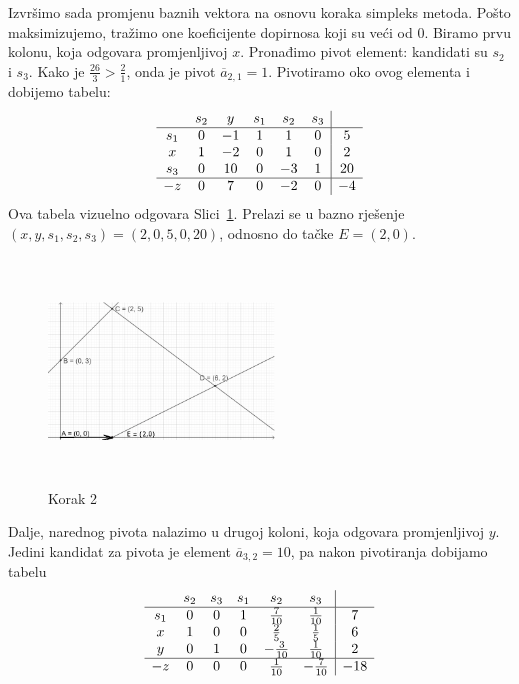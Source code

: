 \documentclass[a4paper, utf8, 11pt, colorlinks]{book}
\theoremstyle{definition}
\begin{document}
Izvršimo sada promjenu baznih vektora na osnovu  koraka simpleks metoda. Pošto maksimizujemo, 
tražimo one koeficijente dopirnosa koji su veći od 0. Biramo prvu kolonu, koja odgovara promjenljivoj $x$. Pronađimo 
pivot element: kandidati su $s_2$ i $s_3$.
Kako je $\frac{26}{3} > \frac{2}{1}$, onda je  pivot $\overline{a}_{2, 1} = 1$. Pivotiramo oko ovog elementa i dobijemo tabelu:
$$\begin{array}{cccccc| c}
       & s_2  & y  & s_1  & s_2 & s_3 &    \\ \hline
   s_1 & 0    & -1  & 1  & 1 & 0  &  5     \\
   x   & 1    & -2  & 0  & 1 & 0  &  2     \\
   s_3 & 0    & 10   &  0  & -3 & 1 & 20   \\ \hline
   -z  & 0    &  7   & 0   & -2 & 0 & -4   \\ 
\end{array}
$$ 
Ova tabela vizuelno odgovara Slici~\ref{fig:step-2}. Prelazi se u bazno rješenje $(x,y, s_1, s_2, s_3)=(2, 0, 5, 0 ,20)$, odnosno do tačke $E=(2, 0)$. 

\begin{figure}[!ht]
	\centering
	\includegraphics[width=170pt, height=170pt]{simpleks-primjer-2-sl2.eps}
	\caption{Korak 2}
	\label{fig:step-2}
\end{figure}
Dalje, narednog pivota nalazimo u drugoj koloni, koja odgovara promjenljivoj $y$. Jedini kandidat za pivota je element $\overline{a}_{3, 2}= 10$, pa nakon pivotiranja dobijamo tabelu 
$$\begin{array}{cccccc| c}
	& s_2  & s_3   & s_1  & s_2 & s_3 &     \\ \hline
s_1 & 0    &  0    & 1    &  \frac{7}{10}  & \frac{1}{10} &   7  \\  
x   & 1    &  0    & 0    &  \frac{2}{5}   & \frac{1}{5}  &   6  \\
y   & 0    &  1    & 0    & - \frac{3}{10}  & \frac{1}{10} &   2  \\ \hline
-z  & 0    &  0    & 0    &   \frac{1}{10} &-\frac{7}{10}  &  -18 \\ 
\end{array}
$$ 
\end{document}
